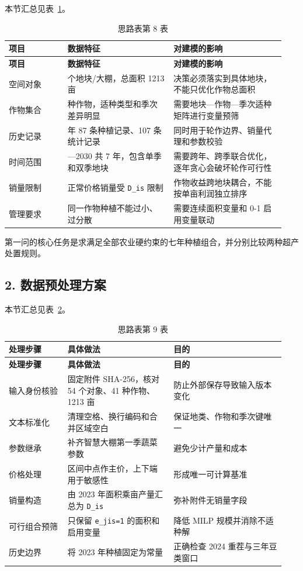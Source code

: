 \documentclass[UTF8,11pt,a4paper]{ctexart}
\begin{document}
\noindent 本节汇总见表~\ref{tab:thought-8}。
\begin{longtable}{@{}>{\raggedright\arraybackslash}p{0.20\linewidth}>{\raggedright\arraybackslash}p{0.36\linewidth}>{\raggedright\arraybackslash}p{0.38\linewidth}@{}}
\caption{思路表第 8 表}\label{tab:thought-8}\\
\toprule
\textbf{项目} & \textbf{数据特征} & \textbf{对建模的影响} \\
\midrule
\endfirsthead
\toprule
\textbf{项目} & \textbf{数据特征} & \textbf{对建模的影响} \\
\midrule
\endhead
空间对象 & 54 个地块/大棚，总面积 1213 亩 & 决策必须落实到具体地块，不能只优化作物总面积 \\
作物集合 & 41 种作物，适种类型和季次差异明显 & 需要地块—作物—季次适种矩阵进行变量预筛 \\
历史记录 & 2023 年 87 条种植记录、107 条统计记录 & 同时用于轮作边界、销量代理和参数校验 \\
时间范围 & 2024—2030 共 7 年，包含单季和双季地块 & 需要跨年、跨季联合优化，逐年贪心会破坏轮作可行性 \\
销量限制 & 正常价格销量受 \texttt{D\_is} 限制 & 作物收益跨地块耦合，不能按单亩利润独立排序 \\
管理要求 & 同一作物种植不能过小、过分散 & 需要连续面积变量和 0-1 启用变量联动 \\
\bottomrule
\end{longtable}

第一问的核心任务是求满足全部农业硬约束的七年种植组合，并分别比较两种超产处置规则。

\subsection{2. 数据预处理方案}

\noindent 本节汇总见表~\ref{tab:thought-9}。
\begin{longtable}{@{}>{\raggedright\arraybackslash}p{0.20\linewidth}>{\raggedright\arraybackslash}p{0.36\linewidth}>{\raggedright\arraybackslash}p{0.38\linewidth}@{}}
\caption{思路表第 9 表}\label{tab:thought-9}\\
\toprule
\textbf{处理步骤} & \textbf{具体做法} & \textbf{目的} \\
\midrule
\endfirsthead
\toprule
\textbf{处理步骤} & \textbf{具体做法} & \textbf{目的} \\
\midrule
\endhead
输入身份核验 & 固定附件 SHA-256，核对 54 个对象、41 种作物、1213 亩 & 防止外部保存导致输入版本变化 \\
文本标准化 & 清理空格、换行编码和合并区域空白 & 保证地类、作物和季次键唯一 \\
参数继承 & 补齐智慧大棚第一季蔬菜参数 & 避免少计产量和成本 \\
价格处理 & 区间中点作主价，上下端用于敏感性 & 形成唯一可计算基准 \\
销量构造 & 由 2023 年面积乘亩产量汇总为 \texttt{D\_is} & 弥补附件无销量字段 \\
可行组合预筛 & 只保留 \texttt{e\_jis=1} 的面积和启用变量 & 降低 MILP 规模并消除不适种解 \\
历史边界 & 将 2023 年种植固定为常量 & 正确检查 2024 重茬与三年豆类窗口 \\
\bottomrule
\end{longtable}
\end{document}

